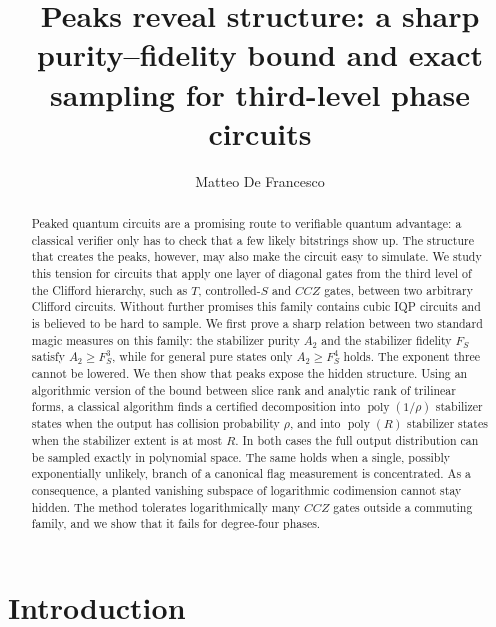\documentclass[a4paper,onecolumn,11pt,unpublished]{quantumarticle}
\theoremstyle{plain}
\theoremstyle{remark}
\DeclareMathOperator{\poly}{poly}
\begin{document}
\title{Peaks reveal structure: a sharp purity--fidelity bound and exact sampling for third-level phase circuits}

\author{Matteo De Francesco}

\maketitle

\begin{abstract}
Peaked quantum circuits are a promising route to verifiable quantum advantage: a classical verifier only has to check that a few likely bitstrings show up. The structure that creates the peaks, however, may also make the circuit easy to simulate. We study this tension for circuits that apply one layer of diagonal gates from the third level of the Clifford hierarchy, such as $T$, controlled-$S$ and $CCZ$ gates, between two arbitrary Clifford circuits. Without further promises this family contains cubic IQP circuits and is believed to be hard to sample. We first prove a sharp relation between two standard magic measures on this family: the stabilizer purity $A_2$ and the stabilizer fidelity $F_S$ satisfy $A_2\ge F_S^3$, while for general pure states only $A_2\ge F_S^4$ holds. The exponent three cannot be lowered. We then show that peaks expose the hidden structure. Using an algorithmic version of the bound between slice rank and analytic rank of trilinear forms, a classical algorithm finds a certified decomposition into $\poly(1/\rho)$ stabilizer states when the output has collision probability $\rho$, and into $\poly(R)$ stabilizer states when the stabilizer extent is at most $R$. In both cases the full output distribution can be sampled exactly in polynomial space. The same holds when a single, possibly exponentially unlikely, branch of a canonical flag measurement is concentrated. As a consequence, a planted vanishing subspace of logarithmic codimension cannot stay hidden. The method tolerates logarithmically many $CCZ$ gates outside a commuting family, and we show that it fails for degree-four phases.
\end{abstract}

\section{Introduction}
\end{document}
